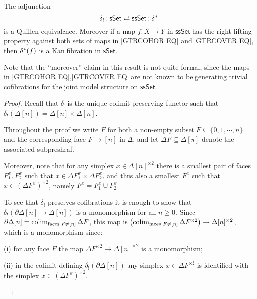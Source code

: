 \documentclass[a4paper,10pt
 ,draft
]{article}%
\begin{document}
\begin{corollary}\label{SSETSSETADJ COR}
	The adjunction
\[
	\delta_{!}\colon \mathsf{sSet} 
		\rightleftarrows 
	\mathsf{ssSet} \colon \delta^{\**}
\]
is a Quillen equivalence.
Moreover if a map $f\colon X \to Y$ in $\mathsf{ssSet}$ has the right lifting property
against both sets of maps in
\eqref{GTRCOHOR EQ} and \eqref{GTRCOVER EQ}, then
$\delta^{\**} (f)$ is a Kan fibration in $\mathsf{sSet}$.
\end{corollary}

Note that the ``moreover'' claim in this result is not quite formal, since the maps in \eqref{GTRCOHOR EQ},\eqref{GTRCOVER EQ} are not known to be generating trivial cofibrations for the joint model structure on $\mathsf{ssSet}$.


\begin{proof}
	Recall that $\delta_!$ is the unique colimit preserving functor such that 
	$\delta_!(\Delta[n])=\Delta[n] \times \Delta[n]$.

Throughout the proof we write $F$ for both a non-empty subset $F \subseteq \{0,1,\cdots,n\}$ and the corresponding face $F \to [n]$ in $\Delta$, and let $\Delta F \subseteq \Delta[n]$ denote the associated subpresheaf. 


Moreover, note that for any simplex
$x \in \Delta[n]^{\times 2}$ there is a smallest pair of faces
$F_1^x, F_2^x$ such that
$x \in \Delta F_1^x \times \Delta F_2^x$, and thus also a smallest 
$F^x$ such that $x \in (\Delta F^x)^{\times 2}$,
namely $F^x = F^x_1 \cup F^x_2$.


	To see that $\delta_!$ preserves cofibrations 
	it is enough to show that 
	$\delta_{!}\left( \partial \Delta[n] \to \Delta[n]\right)$
	is a monomorphism for all $n\geq 0$.
	Since
	$\partial \Delta[n] = \mathop{\operatorname{colim}}_{\text{faces }F \neq [n]}\Delta F$, this map is
	$\left(\mathop{\operatorname{colim}}_{\text{faces }F \neq [n]}\Delta F^{\times 2}\right) \to \Delta[n]^{\times 2}$, which is a monomorphism since:
\begin{inparaenum}
	\item[(i)] for any face $F$ the map $\Delta F^{\times 2} \to \Delta[n]^{\times 2}$ is a monomorphism;
	\item[(ii)] in the colimit defining $\delta_{!} \left(\partial \Delta[n]\right)$ any simplex $x \in \Delta F^{\times 2}$ is identified with the simplex $x \in (\Delta F^x)^{\times 2}$.
\end{inparaenum}




\end{proof}
\end{document}

